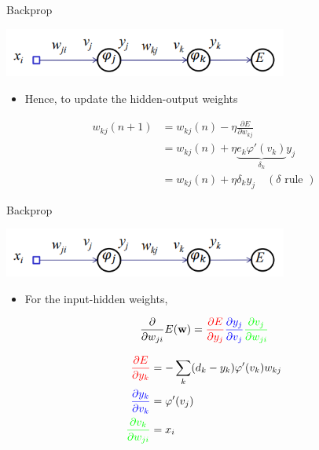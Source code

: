 \documentclass[notes]{beamer}
\providecommand{\tightlist}{%
  \setlength{\itemsep}{0pt}\setlength{\parskip}{0pt}}
\begin{document}
\begin{frame}{Backprop}

\centering 

\includegraphics[width=0.70000\textwidth]{2018-03-10-13-49-42.png}\\

\begin{itemize}
\tightlist
\item
  Hence, to update the hidden-output weights
\end{itemize}

\begin{align}
    w_{kj} (n+1 ) & = w_{kj} (n) - \eta \frac{\partial E}{\partial w_{kj}} \\
    &= w_{kj} (n) + \eta \underbrace{ e_k \varphi ' (v_k)  }_{\delta_k} y_j  \\ 
    &= w_{kj}(n) + \eta \delta_k y_j \quad (\delta \textrm{ rule }) 
\end{align}

\end{frame}

\begin{frame}{Backprop}

\centering 

\includegraphics[width=0.70000\textwidth]{2018-03-10-13-49-42.png}\\

\begin{itemize}
\tightlist
\item
  For the input-hidden weights,
\end{itemize}

\begin{equation}
  \frac{\partial }{\partial w_{ji}} E(\mathbf{w}) = 
    \textcolor{red}{
        \frac{\partial E}{\partial y_j}} 
    \textcolor{blue}{
        \frac{\partial y_j}{\partial v_j}
    } 
    \textcolor{green}{
        \frac{\partial v_j}{\partial w_{ji}}
    }
\end{equation}

\begin{align}
    \textcolor{red}{
        \frac{\partial E}{\partial y_k}
    } & = - \sum_{k}(d_k - y_k) \varphi ' (v_k) w_{kj} \\
    \textcolor{blue}{
        \frac{\partial y_k}{\partial v_k}
    } & = \varphi ' (v_j)                               \\
    \textcolor{green}{
        \frac{\partial v_k}{\partial w_{ji}}
    } & = x_i
\end{align}

\end{frame}
\end{document}
